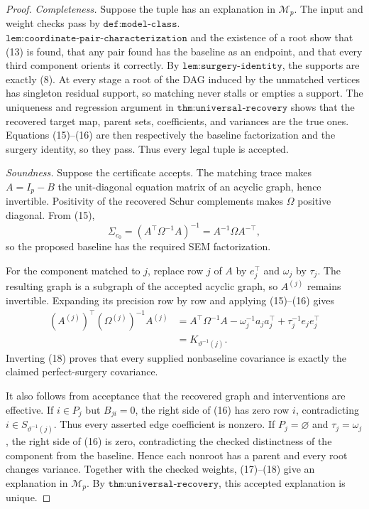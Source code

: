 \documentclass{article}
\begin{document}
\begin{proof}
\emph{Completeness.}
Suppose the tuple has an explanation in \(\mathcal M_p\).  The input and
weight checks pass by \(\texttt{def:model-class}\).
\(\texttt{lem:coordinate-pair-characterization}\) and the existence of a
root show that (13) is found, that any pair found has the baseline as an
endpoint, and that every third component orients it correctly.  By
\(\texttt{lem:surgery-identity}\), the supports are exactly (8).
At every stage a root of the DAG induced by the unmatched vertices has
singleton residual support, so matching never stalls or empties a support.
The uniqueness and regression argument in
\(\texttt{thm:universal-recovery}\) shows that the recovered target map,
parent sets, coefficients, and variances are the true ones.  Equations
(15)--(16) are then respectively the baseline factorization and the
surgery identity, so they pass.  Thus every legal tuple is accepted.

\emph{Soundness.}
Suppose the certificate accepts.  The matching trace makes
\(A=I_p-B\) the unit-diagonal equation matrix of an acyclic graph, hence
invertible.  Positivity of the recovered Schur complements makes
\(\Omega\) positive diagonal.  From (15),
\[
 \Sigma_{c_0}
 =(A^{\top}\Omega^{-1}A)^{-1}
 =A^{-1}\Omega A^{-\top},                                        \tag{17}
\]
so the proposed baseline has the required SEM factorization.

For the component matched to \(j\), replace row \(j\) of \(A\) by
\(e_j^{\top}\) and \(\omega_j\) by \(\tau_j\).  The resulting graph is a
subgraph of the accepted acyclic graph, so \(A^{(j)}\) remains invertible.
Expanding its precision row by row and applying (15)--(16) gives
\[
 \begin{aligned}
 (A^{(j)})^{\top}(\Omega^{(j)})^{-1}A^{(j)}
 &=A^{\top}\Omega^{-1}A
   -\omega_j^{-1}a_ja_j^{\top}
   +\tau_j^{-1}e_je_j^{\top}\\
 &=K_{\vartheta^{-1}(j)} .
 \end{aligned}                                                     \tag{18}
\]
Inverting (18) proves that every supplied nonbaseline covariance is
exactly the claimed perfect-surgery covariance.

It also follows from acceptance that the recovered graph and interventions
are effective.  If \(i\in P_j\) but \(B_{ji}=0\), the right side of (16)
has zero row \(i\), contradicting \(i\in S_{\vartheta^{-1}(j)}\).
Thus every asserted edge coefficient is nonzero.  If \(P_j=\varnothing\)
and \(\tau_j=\omega_j\), the right side of (16) is zero, contradicting the
checked distinctness of the component from the baseline.  Hence each
nonroot has a parent and every root changes variance.  Together with the
checked weights, (17)--(18) give an explanation in \(\mathcal M_p\).
By \(\texttt{thm:universal-recovery}\), this accepted explanation is
unique.


\end{proof}
\end{document}
